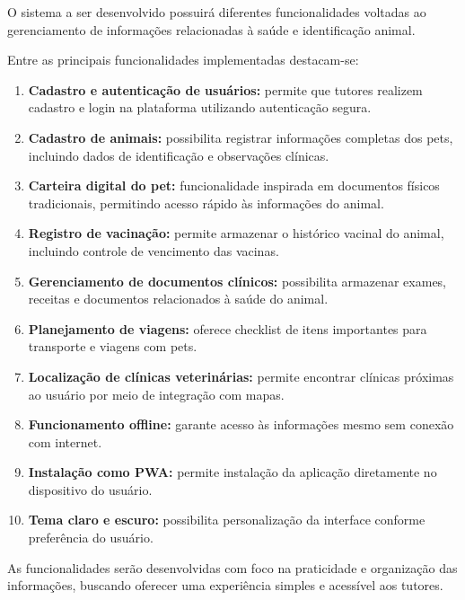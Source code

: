 \documentclass{UNESC}
\begin{document}
O sistema a ser desenvolvido possuirá diferentes funcionalidades voltadas ao gerenciamento de informações relacionadas à saúde e identificação animal.

Entre as principais funcionalidades implementadas destacam-se:

\begin{enumerate}[label=\alph*)]
    \item \textbf{Cadastro e autenticação de usuários:} permite que tutores realizem cadastro e login na plataforma utilizando autenticação segura.

    \item \textbf{Cadastro de animais:} possibilita registrar informações completas dos pets, incluindo dados de identificação e observações clínicas.

    \item \textbf{Carteira digital do pet:} funcionalidade inspirada em documentos físicos tradicionais, permitindo acesso rápido às informações do animal.

    \item \textbf{Registro de vacinação:} permite armazenar o histórico vacinal do animal, incluindo controle de vencimento das vacinas.

    \item \textbf{Gerenciamento de documentos clínicos:} possibilita armazenar exames, receitas e documentos relacionados à saúde do animal.

    \item \textbf{Planejamento de viagens:} oferece checklist de itens importantes para transporte e viagens com pets.

    \item \textbf{Localização de clínicas veterinárias:} permite encontrar clínicas próximas ao usuário por meio de integração com mapas.

    \item \textbf{Funcionamento offline:} garante acesso às informações mesmo sem conexão com internet.

    \item \textbf{Instalação como PWA:} permite instalação da aplicação diretamente no dispositivo do usuário.

    \item \textbf{Tema claro e escuro:} possibilita personalização da interface conforme preferência do usuário.
\end{enumerate}

As funcionalidades serão desenvolvidas com foco na praticidade e organização das informações, buscando oferecer uma experiência simples e acessível aos tutores.
\end{document}
